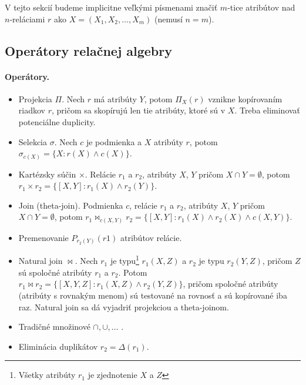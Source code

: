 \documentclass[10pt,a4paper]{article}
\begin{document}
V tejto sekcií budeme implicitne veľkými písmenami značiť $m$-tice atribútov nad $n$-reláciami $r$ ako $X = (X_1, X_2, \ldots, X_m)$ (nemusí $n=m$). 

\subsection{Operátory relačnej algebry}

\paragraph{Operátory.}
\begin{itemize}
\item Projekcia $\Pi$. Nech $r$ má atribúty $Y$, potom $\Pi_X(r)$ vznikne kopírovaním riadkov $r$, pričom sa skopírujú len tie atribúty, ktoré sú v $X$. Treba eliminovať potenciálne duplicity. 
\item Selekcia $\sigma$. Nech $c$ je podmienka a $X$ atribúty $r$, potom $\sigma_{c(X)} = \{X:r(X) \wedge c(X)\}$. 
\item Kartézsky súčin $\times$. Relácie $r_1$ a $r_2$, atribúty $X$, $Y$ pričom $X \cap Y = \emptyset$, potom $r_1 \times r_2 = \{[X,Y]:r_1(X) \wedge r_2(Y)\}$.
\item Join (theta-join). Podmienka $c$, relácie $r_1$ a $r_2$, atribúty $X$, $Y$ pričom $X \cap Y = \emptyset$, potom $r_1 \Join_{c(X,Y)} r_2 = \{[X,Y]:r_1(X) \wedge r_2(X) \wedge c(X,Y)\}$.
\item Premenovanie $P_{r_2(Y)}(r1)$ atribútov relácie.
\item Natural join $\Join$. Nech $r_1$ je typu\footnote{Všetky atribúty $r_1$ je zjednotenie $X$ a $Z$} $r_1(X, Z)$ a $r_2$ je typu $r_2(Y, Z)$, pričom $Z$ sú spoločné
atribúty $r_1$ a $r_2$. Potom $r_1 \Join r_2 = \{[X,Y,Z]:r_1(X,Z) \wedge r_2(Y,Z)\}$, pričom
spoločné atribúty (atribúty s rovnakým menom) sú testované na
rovnosť a sú kopírované iba raz. Natural join sa dá vyjadriť projekciou a theta-joinom. 
\item Tradičné množinové $\cap, \cup, \ldots $ .
\item Eliminácia duplikátov $r_2 = \Delta(r_1)$.
\end{itemize}
\end{document}
